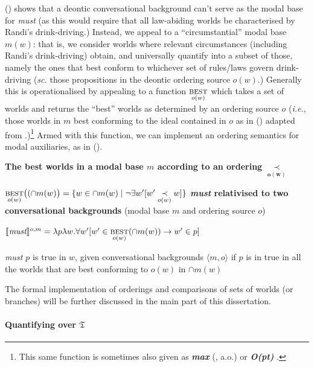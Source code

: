 \documentclass[12pt,dvipsnames]{report}
\providecommand{\denote}[2][]{\ensuremath{\llbracket{#2}\rrbracket^{#1}}}
\begin{document}
\noindent(\lastx) shows that a deontic conversational background can't serve as the modal base for \textit{must} (as this would require that all law-abiding worlds be characterised by Randi's drink-driving.) Instead, we appeal to a ``circumstantial'' modal base $ m(w) $: that is, we consider worlds where relevant circumstances (including Randi's drink-driving) obtain, and universally quantify into a subset of those, namely the ones that best conform to whichever set of rules/laws govern drink-driving (\textit{sc.} those propositions in the deontic ordering source $ o(w) $.) Generally this is operationalised by appealing to a function $ \underset{o(w)}{\textsc{best}}$ which takes a set of worlds and returns the ``best'' worlds as determined by an ordering source $ o $ (\textit{i.e.}, those worlds in $ m $ best conforming to the ideal contained in $ o $ as in (\nextx) adapted from \citealp[61]{VonFintel2011}.)\footnote{This same function is sometimes also given as \textbf{\textit{max}} (\citealp[\textit{e.g.},][]{Hacquard2006,VonFintel2008,VonFintel2011}, a.o.) or \textbf{\textit{O(pt)}} \citep[247]{Schwager2006}.} Armed with this function, we can implement an ordering semantics for modal auxiliaries, as in ().

\ex \textbf{The best worlds in a modal base $ m $ according to an ordering} $\boldsymbol{\underset{o(w)}{\prec}}$

$ \underset{o(w)}{\textsc{best}}\big((\cap m(w)\big)=\{w\in\cap m(w)\mid \neg\exists w'[w'\underset{o(w)}{\prec}w]\}$\label{ord-source}\xe
\pex \textbf{\textit{must} relativised to two conversational backgrounds} (modal base $ m $ and ordering source $ o $)

$\denote[o,m]{\textit{must}}=\lambda p\lambda w.\forall w'[w'\in\underset{o(w)}{\textsc{best}}(\cap m(w))\to w'\in p] $

\textit{must $ p $} is true in $ w $, given conversational backgrounds $ \langle{m,o}\rangle $ if $ p $ is in true in all the worlds that are best conforming to $ o(w) $ in $ \cap m(w) $
\xe





The formal implementation of orderings and comparisons of sets of worlds (or branches) will be further discussed in the main part of this dissertation.

\paragraph{Quantifying over $ \mathfrak{T} $}
\end{document}
